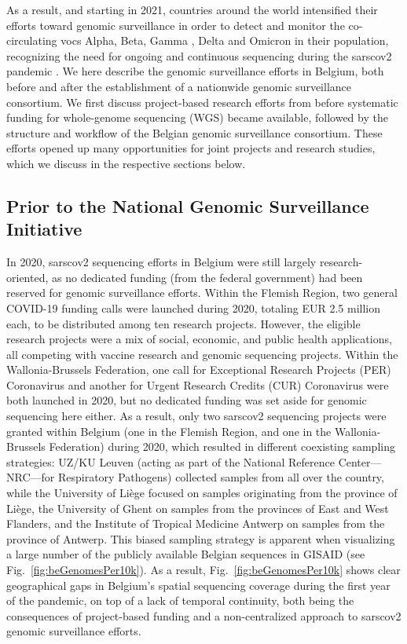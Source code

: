 As a result, and starting in 2021, countries around the world intensified their efforts toward genomic surveillance in order to detect and monitor the co-circulating \gls{voc}s Alpha, Beta, Gamma \citep{greaney2021comprehensive}, Delta and Omicron in their population, recognizing the need for ongoing and continuous sequencing during the \gls{sarscov2} pandemic \citep{martin2021insights}.
We here describe the genomic surveillance efforts in Belgium, both before and after the establishment of a nationwide genomic surveillance consortium.
We first discuss project-based research efforts from before systematic funding for whole-genome sequencing (WGS) became available, followed by the structure and workflow of the Belgian genomic surveillance consortium.
These efforts opened up many opportunities for joint projects and research studies, which we discuss in the respective sections below.


\subsection{Prior to the National Genomic Surveillance Initiative}
In 2020, \gls{sarscov2} sequencing efforts in Belgium were still largely research-oriented, as no dedicated funding (from the federal government) had been reserved for genomic surveillance efforts.
Within the Flemish Region, two general COVID-19 funding calls were launched during 2020, totaling EUR 2.5 million each, to be distributed among ten research projects.
However, the eligible research projects were a mix of social, economic, and public health applications, all competing with vaccine research and genomic sequencing projects.
Within the Wallonia-Brussels Federation, one call for Exceptional Research Projects (PER) Coronavirus and another for Urgent Research Credits (CUR) Coronavirus were both launched in 2020, but no dedicated funding was set aside for genomic sequencing here either.
As a result, only two \gls{sarscov2} sequencing projects were granted within Belgium (one in the Flemish Region, and one in the Wallonia-Brussels Federation) during 2020, which resulted in different coexisting sampling strategies: UZ/KU Leuven (acting as part of the National Reference Center—NRC—for Respiratory Pathogens) collected samples from all over the country, while the University of Li\`{e}ge focused on samples originating from the province of Li\`{e}ge, the University of Ghent on samples from the provinces of East and West Flanders, and the Institute of Tropical Medicine Antwerp on samples from the province of Antwerp.
This biased sampling strategy is apparent when visualizing a large number of the publicly available Belgian sequences in GISAID (see Fig.~\ref{fig:beGenomesPer10k}).
As a result, Fig.~\ref{fig:beGenomesPer10k} shows clear geographical gaps in Belgium's spatial sequencing coverage during the first year of the pandemic, on top of a lack of temporal continuity, both being the consequences of project-based funding and a non-centralized approach to \gls{sarscov2} genomic surveillance efforts.

